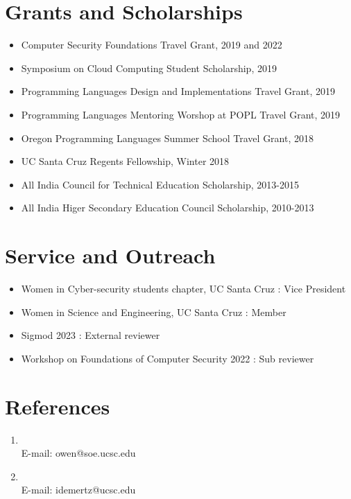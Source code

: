 \documentclass[9pt,a4paper]{moderncv}
\begin{document}
\section{Grants and Scholarships} 
\begin{itemize}
\item Computer Security Foundations Travel Grant, 2019 and 2022 
\item Symposium on Cloud Computing Student Scholarship, 2019
\item Programming Languages Design and Implementations Travel Grant, 2019
\item Programming Languages Mentoring Worshop at POPL Travel Grant, 2019
\item Oregon Programming Languages Summer School Travel Grant, 2018
\item UC Santa Cruz Regents Fellowship, Winter 2018
\item All India Council for Technical Education Scholarship, 2013-2015
\item All India Higer Secondary Education Council Scholarship, 2010-2013
\end{itemize}
\section{Service and Outreach}
\begin{itemize}
\item Women in Cyber-security students chapter, UC Santa Cruz : Vice President
\item Women in Science and Engineering, UC Santa Cruz : Member
\item Sigmod 2023 : External reviewer
\item Workshop on Foundations of Computer Security 2022 : Sub reviewer
\end{itemize}
\section{References}
\begin{enumerate}
\item \underline{} 
\\
E-mail: owen@soe.ucsc.edu \\
\item \underline{} 
\\
E-mail: idemertz@ucsc.edu \\
\vspace{6 mm}
\end{enumerate}
\end{document}
